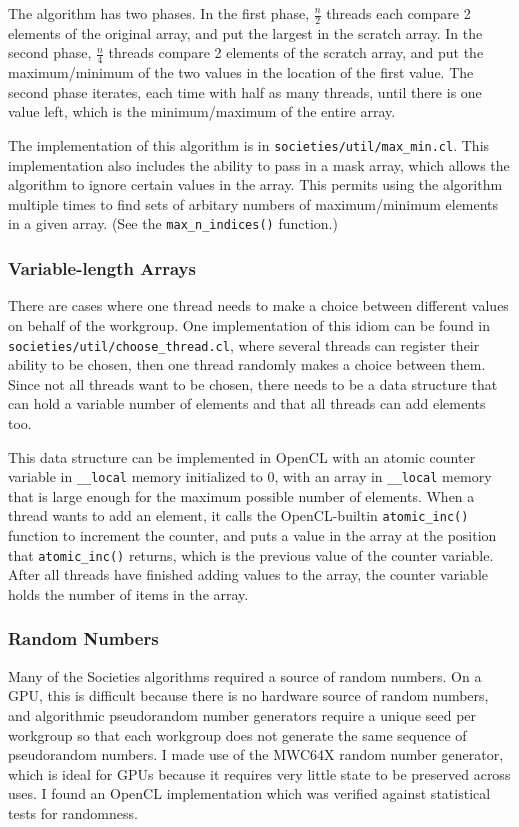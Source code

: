 \documentclass{article}
\begin{document}
The algorithm has two phases. In the first phase, $\frac{n}{2}$ threads each compare 2 elements of the original array, and put the largest in the scratch array. In the second phase, $\frac{n}{4}$ threads compare 2 elements of the scratch array, and put the maximum/minimum of the two values in the location of the first value. The second phase iterates, each time with half as many threads, until there is one value left, which is the minimum/maximum of the entire array.

The implementation of this algorithm is in \texttt{societies/util/max\_min.cl}. This implementation also includes the ability to pass in a mask array, which allows the algorithm to ignore certain values in the array. This permits using the algorithm multiple times to find sets of arbitary numbers of maximum/minimum elements in a given array. (See the \texttt{max\_n\_indices()} function.)


\subsubsection{Variable-length Arrays}
There are cases where one thread needs to make a choice between different values on behalf of the workgroup. One implementation of this idiom can be found in \texttt{societies/util/choose\_thread.cl}, where several threads can register their ability to be chosen, then one thread randomly makes a choice between them. Since not all threads want to be chosen, there needs to be a data structure that can hold a variable number of elements and that all threads can add elements too.

This data structure can be implemented in OpenCL with an atomic counter variable in \texttt{\_\_local} memory initialized to 0, with an array in \texttt{\_\_local} memory that is large enough for the maximum possible number of elements. When a thread wants to add an element, it calls the OpenCL-builtin \texttt{atomic\_inc()} function to increment the counter, and puts a value in the array at the position that \texttt{atomic\_inc()} returns, which is the previous value of the counter variable. After all threads have finished adding values to the array, the counter variable holds the number of items in the array.

\subsubsection{Random Numbers}
Many of the Societies algorithms required a source of random numbers. On a GPU, this is difficult because there is no hardware source of random numbers, and algorithmic pseudorandom number generators require a unique seed per workgroup so that each workgroup does not generate the same sequence of pseudorandom numbers. I made use of the MWC64X random number generator, which is ideal for GPUs because it requires very little state to be preserved across uses. I found an OpenCL implementation which was verified against statistical tests for randomness.\cite{mwc64x}
\end{document}
